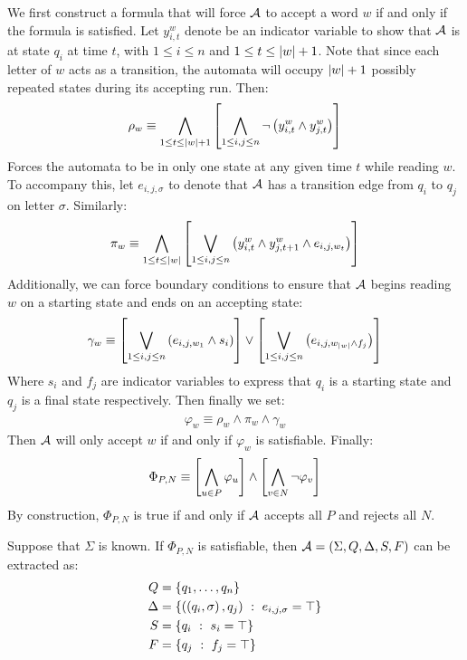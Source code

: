 We first construct a formula that will force \(\mathcal{A}\) to accept
a word \(w\) if and only if the formula is satisfied.
Let \(y_{i, t}^w\) denote be an indicator variable
to show that \(\mathcal{A}\) is at state \(q_i\) at time \(t\),
with \(1 \leq i \leq n\) and \(1 \leq t \leq \left\lvert w\right\rvert + 1\).
Note that since each letter of \(w\) acts as a transition,
the automata will occupy \(\left\lvert w\right\rvert + 1\) possibly repeated
states during its accepting run.
Then:
\begin{align*}
  \rho_w \equiv
    \bigwedge_{1 \leq t \leq \left\lvert w\right\rvert + 1}
      \left[\bigwedge_{1 \leq i, j \leq n}
        \neg \left(y_{i, t} ^w \land y_{j, t} ^w\right)\right]
\end{align*}
Forces the automata to be in only one state at any given time \(t\)
while reading \(w\).
To accompany this, let \(e_{i, j, \sigma}\) to denote
that \(\mathcal{A}\) has a transition edge from \(q_i\) to \(q_j\)
on letter \(\sigma\).
Similarly:
\begin{align*}
  \pi_w \equiv
    \bigwedge_{1 \leq t \leq \left\lvert w\right\rvert}
      \left[\bigvee_{1 \leq i, j \leq n}
      \left(y_{i, t} ^w \land y_{j, t + 1} ^w \land e_{i, j, w_t}\right)\right]
\end{align*}
Additionally, we can force boundary conditions to ensure that \(\mathcal{A}\)
begins reading \(w\) on a starting state and ends on an accepting state:
\begin{align*}
  \gamma_{w} \equiv
    \left[\bigvee_{1 \leq i, j \leq n}
        \left(e_{i, j, w_{1}} \land s_i\right)\right]
      \lor
    \left[\bigvee_{1 \leq i, j \leq n}
        \left(e_{i, j, w_{\left\lvert w\right\rvert} \land f_j}\right)\right]
\end{align*}
Where \(s_i\) and \(f_j\) are indicator variables to express that
\(q_i\) is a starting state and \(q_j\) is a final state respectively.
Then finally we set:
\begin{align*}
  \varphi_{w} \equiv \rho_w \land \pi_w \land \gamma_w
\end{align*}
Then \(\mathcal{A}\) will only accept \(w\) if and only if \(\varphi_w\)
is satisfiable.
Finally:
\begin{align*}
  \Phi_{P, N} \equiv
    \left[\bigwedge_{u \in P} \varphi_u\right]
      \land
    \left[\bigwedge_{v \in N} \neg \varphi_v\right]
\end{align*}
By construction, \(\Phi_{P, N}\) is true if and only if \(\mathcal{A}\)
accepts all \(P\) and rejects all \(N\).

Suppose that \(\Sigma\) is known.
If \(\Phi_{P, N}\) is satisfiable,
then \(\mathcal{A} = \left(\Sigma, Q, \Delta, S, F\right)\) can be extracted as:
\begin{align*}
  Q &= \left\{q_1, \ldots, q_n\right\} \\
  \Delta &= \left\{\left(\left(q_i, \sigma\right), q_j\right) \  : \  e_{i, j, \sigma} = \top\right\} \\
  S &= \left\{q_i \  : \  s_i = \top\right\} \\
  F &= \left\{q_j \  : \  f_j = \top\right\} \\
\end{align*}



